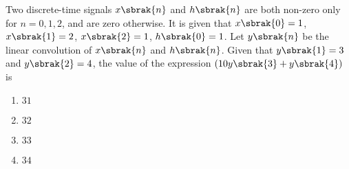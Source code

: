 \item Two discrete-time signals $x\sbrak{n}$ and $h\sbrak{n}$ are both non-zero only for $n = 0, 1, 2$, and are zero otherwise. It is given that $x\sbrak{0} = 1$, $x\sbrak{1} = 2$, $x\sbrak{2} = 1$, $h\sbrak{0} = 1$. Let $y\sbrak{n}$ be the linear convolution of $x\sbrak{n}$ and $h\sbrak{n}$. Given that $y\sbrak{1} = 3$ and $y\sbrak{2} = 4$, the value of the expression $(10y\sbrak{3} + y\sbrak{4})$ is
\hfill {}
\begin{multicols}{4}
\begin{enumerate}
\item $31$
\item $32$
\item $33$
\item $34$
\end{enumerate}
\end{multicols}

